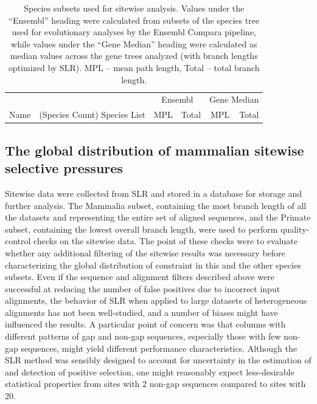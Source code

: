 \begin{table}[ht]
\centering \footnotesize
\begin{tabular}{lb{6cm}rrrr}
\toprule
 & &  \multicolumn{2}{c}{Ensembl} & \multicolumn{2}{c}{Gene Median} \\ \cmidrule(r){3-4} \cmidrule(r){5-6}
Name & (Species Count) Species List & MPL & Total & MPL & Total \\
  \midrule

\bottomrule
\end{tabular}
\caption{Species subsets used for sitewise analysis. Values under the
  ``Ensembl'' heading were calculated from subsets of the species tree
  used for evolutionary analyses by the Ensembl Compara pipeline,
  while values under the ``Gene Median'' heading were calculated as
  median values across the \ngenes gene trees analyzed (with branch
  lengths optimized by SLR). MPL -- mean path length, Total -- total
  branch length.}
\label{species_set_summary}
\end{table}

\subsection{The global distribution of mammalian sitewise selective pressures}

Sitewise data were collected from SLR and stored in a database for
storage and further analysis. The Mammalia subset, containing the most
branch length of all the datasets and representing the entire set of
aligned sequences, and the Primate subset, containing the lowest
overall branch length, were used to perform quality-control checks on
the sitewise data. The point of these checks were to evaluate whether
any additional filtering of the sitewise results was necessary before
characterizing the global distribution of constraint in this and the
other species subsets. Even if the sequence and alignment filters
described above were successful at reducing the number of false
positives due to incorrect input alignments, the behavior of SLR when
applied to large datasets of heterogeneous alignments has not been
well-studied, and a number of biases might have influenced the
results. A particular point of concern was that columns with different
patterns of gap and non-gap sequences, especially those with few
non-gap sequences, might yield different performance
characteristics. Although the SLR method was sensibly designed to
account for uncertainty in the estimation of \omg and detection of
positive selection, one might reasonably expect less-desirable
statistical properties from sites with 2 non-gap sequences compared to
sites with 20.
 
